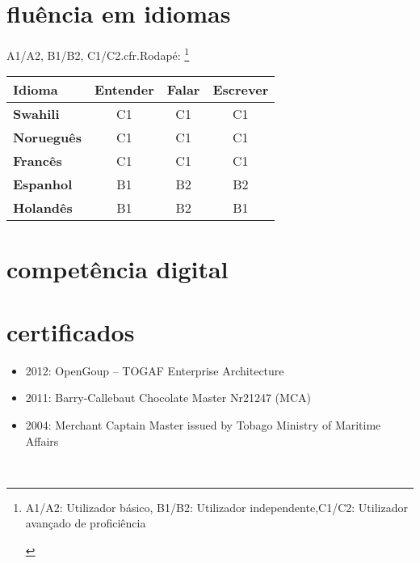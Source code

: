 \documentclass[a4paper]{myfriggeri-cv}
\begin{document}
\section{fluência em idiomas}
A1\slash A2,
B1\slash B2,
C1\slash C2.cfr.Rodapé:
\footnote{A1\slash A2: Utilizador básico,	B1\slash B2: Utilizador independente,C1\slash C2: Utilizador avançado de proficiência

\textbf{}}
{
\begin{table}[htbp]
\begin{minipage}{\linewidth}
\setlength{\tymax}{0.6\linewidth}
\centering
\small
\begin{tabulary}{\textwidth}{@{}lccc@{}} \toprule
 \textbf{Idioma}   & \textbf{Entender   }& \textbf{Falar   }& \textbf{Escrever   }\\
\midrule

\textbf{Swahili}		 & C1		 & C1 	 & C1		 \\
\textbf{Norueguês}	 & C1		 & C1 	 & C1		 \\
\textbf{Francês}		 & C1		 & C1 	 & C1		 \\
\textbf{Espanhol}   & B1		 & B2 	 & B2		 \\
\textbf{Holandês}   & B1		 & B2 	 & B1		 \\
\bottomrule

\end{tabulary}
\end{minipage}
\end{table}
}
%
\section{competência digital}

\section{certificados}
\begin{entrylist}
\entry
{}
{}
{}%
{}
{ \begin{itemize}
\item{} 2012: OpenGoup – TOGAF Enterprise Architecture
\item{} 2011: Barry-Callebaut Chocolate Master Nr21247 (MCA)
\item{} 2004: Merchant Captain Master issued by Tobago Ministry of Maritime Affairs
\end{itemize}
}
\end{entrylist}
~
~
~
~
\end{document}

